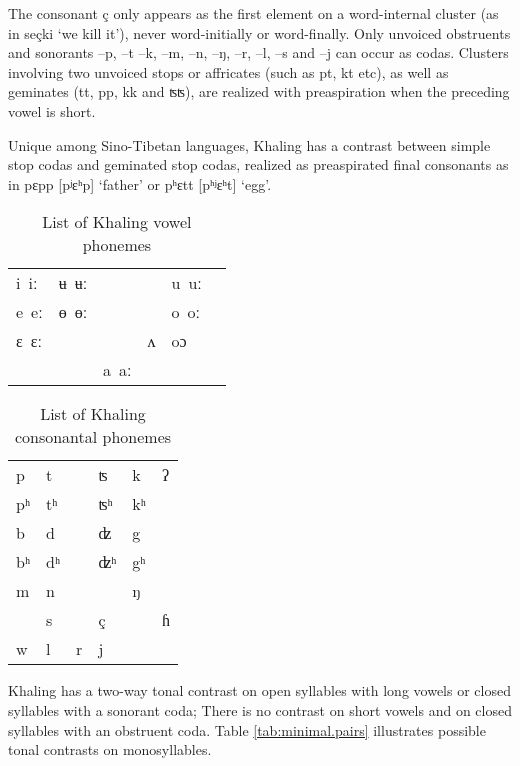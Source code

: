 \documentclass[oldfontcommands,oneside,a4paper,11pt]{article}
\newcommand{\ipa}[1]{{\phon \mbox{#1}}} %
\begin{document}
The consonant \ipa{ç} only appears as the first element on a word-internal cluster (as in \ipa{seçki} `we kill it'), never word-initially or word-finally. Only unvoiced obstruents and sonorants \ipa{--p}, \ipa{--t} \ipa{--k}, \ipa{--m}, \ipa{--n}, \ipa{--ŋ}, \ipa{--r}, \ipa{--l}, \ipa{--s} and \ipa{--j} can occur as codas. Clusters involving two unvoiced stops or affricates (such as \ipa{pt}, \ipa{kt} etc), as well as geminates (\ipa{tt}, \ipa{pp}, \ipa{kk} and \ipa{ʦʦ}), are realized with preaspiration when the preceding vowel is short.

Unique among Sino-Tibetan languages, Khaling has a contrast between simple stop codas and geminated stop codas, realized as preaspirated final consonants as in \ipa{pɛpp} [pʲɛʰp] `father'  or \ipa{pʰɛtt} [pʰʲɛʰt] `egg'.

\begin{table}[H]
\caption{List of Khaling vowel phonemes} \label{tab:vowels}\centering
\begin{tabular}{llllll}
\ipa{i iː} & \ipa{ʉ ʉː} & &&\ipa{u uː} \\
\ipa{e eː} & \ipa{ɵ ɵː} & &&\ipa{o oː} \\
\ipa{ɛ ɛː} &   & &\ipa{ʌ} &  \ipa{oɔ} \\
&&\ipa{a aː}\\
\end{tabular}
\end{table}

\begin{table}[H]
\caption{List of Khaling consonantal phonemes} \label{tab:consonants}\centering
\begin{tabular}{llllll}
\ipa{p} & \ipa{t} &&\ipa{ʦ}  & \ipa{k}&\ipa{ʔ}\\
\ipa{pʰ} & \ipa{tʰ} &&\ipa{ʦʰ}  & \ipa{kʰ}&\\
\ipa{b} & \ipa{d} &&\ipa{ʣ}  & \ipa{g}&\\
\ipa{bʰ} & \ipa{dʰ} &&\ipa{ʣʰ}  & \ipa{gʰ}&\\
\ipa{m} & \ipa{n} && & \ipa{ŋ}&\\
  & \ipa{s} && \ipa{ç}& &\ipa{ɦ}\\
  \ipa{w} & \ipa{l} &\ipa{r}&\ipa{j}  & &\\
\end{tabular}
\end{table}

Khaling has a two-way tonal contrast on open syllables with long vowels or closed syllables with a sonorant coda; There is no contrast on short vowels and on closed syllables with an obstruent coda. Table \ref{tab:minimal.pairs} illustrates possible tonal contrasts on monosyllables.
\end{document}
